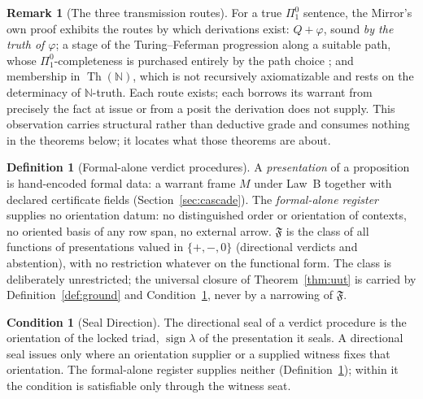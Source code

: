 \documentclass[twocolumn,10pt]{article}
\theoremstyle{plain}
\theoremstyle{definition}
\newtheorem{definition}[theorem]{Definition}
\newtheorem{condition}[theorem]{Condition}
\newtheorem{remark}[theorem]{Remark}
\newcommand{\N}{\mathbb{N}}
\newcommand{\Fr}{\mathfrak{F}}
\begin{document}
\begin{remark}[The three transmission routes]\label{rem:routes}
For a true $\Pi^0_1$ sentence, the Mirror's own proof exhibits the routes by which derivations exist: $Q+\varphi$, sound \emph{by the truth of $\varphi$}; a stage of the Turing--Feferman progression along a suitable path, whose $\Pi^0_1$-completeness is purchased entirely by the path choice \cite{Turing1939,Feferman1962,FefermanSpector1962}; and membership in $\operatorname{Th}(\N)$, which is not recursively axiomatizable and rests on the determinacy of $\N$-truth. Each route exists; each borrows its warrant from precisely the fact at issue or from a posit the derivation does not supply. This observation carries structural rather than deductive grade and consumes nothing in the theorems below; it locates what those theorems are about.
\end{remark}

\begin{definition}[Formal-alone verdict procedures]\label{def:class}
A \emph{presentation} of a proposition is hand-encoded formal data: a warrant frame $M$ under Law~B together with declared certificate fields (Section~\ref{sec:cascade}). The \emph{formal-alone register} supplies no orientation datum: no distinguished order or orientation of contexts, no oriented basis of any row span, no external arrow. $\Fr$ is the class of all functions of presentations valued in $\{+,-,0\}$ (directional verdicts and abstention), with no restriction whatever on the functional form. The class is deliberately unrestricted; the universal closure of Theorem~\ref{thm:uut} is carried by Definition~\ref{def:ground} and Condition~\ref{cond:seal}, never by a narrowing of $\Fr$.
\end{definition}

\begin{condition}[Seal Direction]\label{cond:seal}
The directional seal of a verdict procedure is the orientation of the locked triad, $\operatorname{sign}\lambda$ of the presentation it seals. A directional seal issues only where an orientation supplier or a supplied witness fixes that orientation. The formal-alone register supplies neither (Definition~\ref{def:class}); within it the condition is satisfiable only through the witness seat.
\end{condition}
\end{document}
